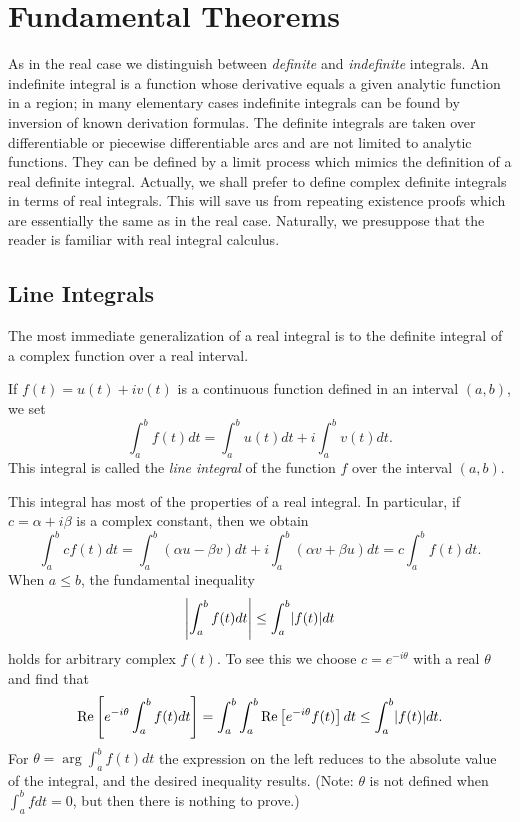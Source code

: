 \chapter{Fundamental Theorems}
\label{chap:fundamental-theorems}
As in the real case we distinguish between \emph{definite} and \emph{indefinite} integrals. An indefinite integral is a function whose derivative equals a given analytic function in a region; in many elementary cases indefinite integrals can be found by inversion of known derivation formulas. The definite integrals are taken over differentiable or piecewise differentiable arcs and are not limited to analytic functions. They can be defined by a limit process which mimics the definition of a real definite integral. Actually, we shall prefer to define complex definite integrals in terms of real integrals. This will save us from repeating existence proofs which are essentially the same as in the real case. Naturally, we presuppose that the reader is familiar with real integral calculus.

\section{Line Integrals}
The most immediate generalization of a real integral is to the definite integral of a complex function over a real interval. 

\begin{definition}
If $f(t)=u(t)+iv(t)$ is a continuous function defined in an interval $(a,b)$, we set $$\int_{a}^{b}f(t)dt=\int_{a}^{b}u(t)dt+i\int_{a}^{b}v(t)dt.$$ This integral is called the \emph{line integral} of the function $f$ over the interval $(a,b)$.
\end{definition}

This integral has most of the properties of a real integral. In particular, if $c=\alpha+i\beta$ is a complex constant, then we obtain $$\int_{a}^{b} cf(t)dt=\int_{a}^{b}(\alpha u-\beta v)dt+i\int_{a}^{b}(\alpha v+\beta u)dt=c\int_{a}^{b} f(t)dt.$$ When $a \le b$, the fundamental inequality $$\left\lvert \int_{a}^{b} f(t)dt\right \rvert\le \int_{a}^{b} \lvert f(t) \rvert dt$$ holds for arbitrary complex $f(t)$. To see this we choose $c=e^{-i\theta}$ with a real $\theta$ and find that $$\operatorname{Re}\left[e^{-i\theta} \int_{a}^{b}f(t)dt\right]=\int_{a}^{b}\int_{a}^{b}\operatorname{Re}\left[e^{-i \theta}f(t)\right]dt \le \int_{a}^{b}\lvert f(t) \rvert dt.$$ For $\theta=\arg \int_{a}^{b}f(t)dt$ the expression on the left reduces to the absolute value of the integral, and the desired inequality results. (Note: $\theta$ is not defined when $\int_{a}^{b} fdt=0$, but then there is nothing to prove.)

